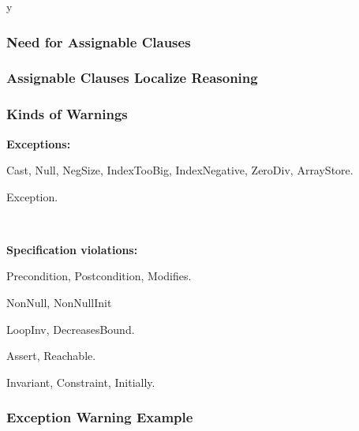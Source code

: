 \if y\MAKEHANDOUTS \documentclass[t,compress,landscape,handout]{beamer}
\begin{document}
\begin{frame}[fragile]
\frametitle{Need for Assignable Clauses}

\end{frame}

\begin{frame}[fragile]
\frametitle{Assignable Clauses Localize Reasoning}

\end{frame}

\begin{frame}
\frametitle{Kinds of Warnings}

\alert{\textbf{Exceptions:}}
\begin{description}[Undeclared:]
\item[Runtime:]
Cast, Null, NegSize, IndexTooBig, IndexNegative, ZeroDiv,
ArrayStore.

\item[Undeclared:] 
Exception.
\end{description}

~

\alert{\textbf{Specification violations:}}
\begin{description}
\item[Method:]
Precondition, Postcondition, Modifies.

\item[Non-null:]
NonNull, NonNullInit

\item[Loop:]
LoopInv, DecreasesBound.

\item[Flow:]
Assert, Reachable.

\item[Class:]
Invariant, Constraint, Initially.
\end{description}
\end{frame}

\begin{frame}[fragile]
\frametitle{Exception Warning Example}
\begin{example}

\end{example}
\end{frame}
\end{document}
